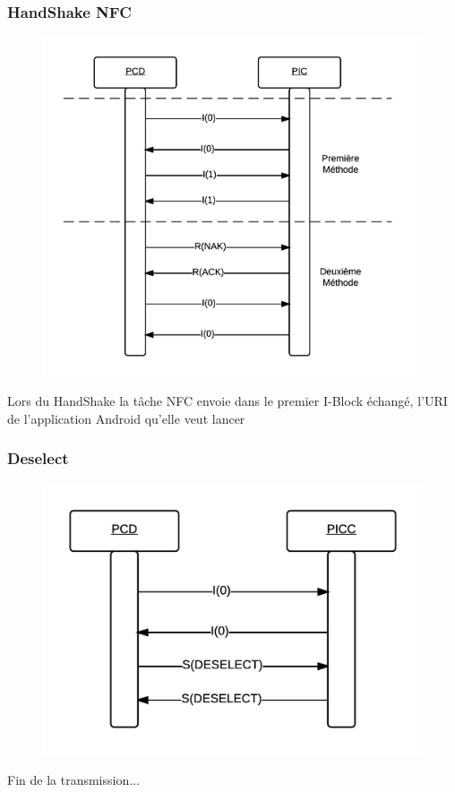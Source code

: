 \documentclass{beamer}
\begin{document}
\begin{frame}
\frametitle{HandShake NFC}
\begin{figure}
\centering
\includegraphics[scale=0.5]{images/presencecheck.png}
\end{figure}

Lors du HandShake la tâche NFC envoie dans le premier I-Block échangé, l'URI de l'application Android qu'elle veut lancer
\end{frame}
\begin{frame}
\frametitle{Deselect}
\begin{figure}
\centering
\includegraphics[scale=0.5]{images/deselect.png}
\end{figure}
Fin de la transmission...
\end{frame}
\end{document}
